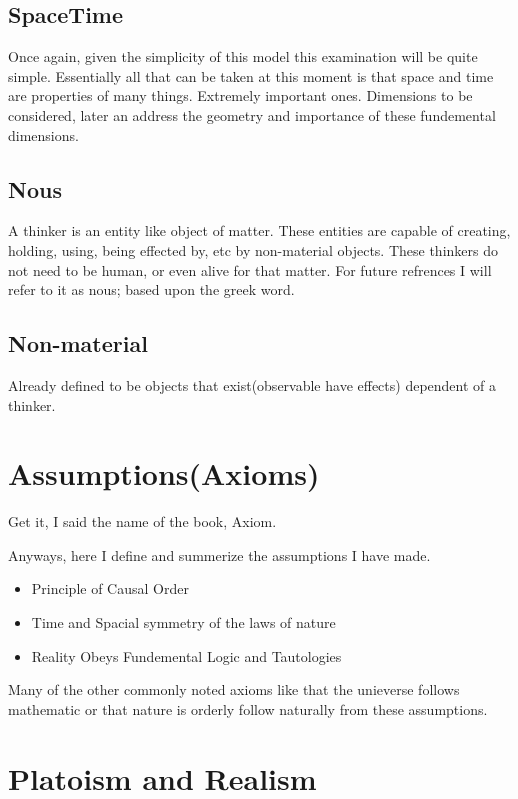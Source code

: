 \subsection{SpaceTime}
Once again, given the simplicity of this model this examination will be quite simple. Essentially all that can be taken at this moment is that
space and time are properties of many things. Extremely important ones. Dimensions to be considered, later an address the geometry and importance of these fundemental dimensions.

\subsection{Nous}
A thinker is an entity like object of matter. These entities are capable of creating, holding, using, being effected by, etc by non-material objects.
These thinkers do not need to be human, or even alive for that matter. For future refrences I will refer to it as nous; based upon the greek word.

\subsection{Non-material}
Already defined to be objects that exist(observable have effects) dependent of a thinker.

\section{Assumptions(Axioms)}

Get it, I said the name of the book, Axiom.

Anyways, here I define and summerize the assumptions I have made.

\begin{itemize}
    \item Principle of Causal Order
    \item Time and Spacial symmetry of the laws of nature
    \item Reality Obeys Fundemental Logic and Tautologies
\end{itemize}
Many of the other commonly noted axioms like that the unieverse follows mathematic or that nature is orderly follow naturally from these assumptions.

\section{Platoism and Realism}

